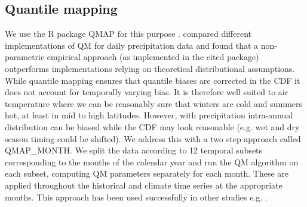 \documentclass[hess, manuscript]{copernicus}
\begin{document}

\subsection{Quantile mapping}
We use the R package QMAP for this purpose \citep{Gudmundsson2012-kn}. \cite{Gudmundsson2012-kn} compared different implementations of QM for daily precipitation data and found that a non-parametric empirical approach (as implemented in the cited package) outperforms implementations relying on theoretical distributional assumptions.
While quantile mapping ensures that quantile biases are corrected in the CDF it does not account for temporally varying bias. It is therefore well suited to air temperature where we can be reasonably sure that winters are cold and summers hot, at least in mid to high latitudes. However, with precipitation intra-annual distribution can be biased while the CDF may look reasonable (e.g. wet and dry season timing could be shifted). We address this with a two step approach called QMAP\_MONTH. We split the data according to 12 temporal subsets corresponding to the months of the calendar year and run the QM algorithm on each subset, computing QM parameters separately for each month. These are applied throughout the historical and climate time series at the appropriate months. This approach has been used successfully in other studies e.g. \citet{Hanzer2018-tz}. 
\end{document}

